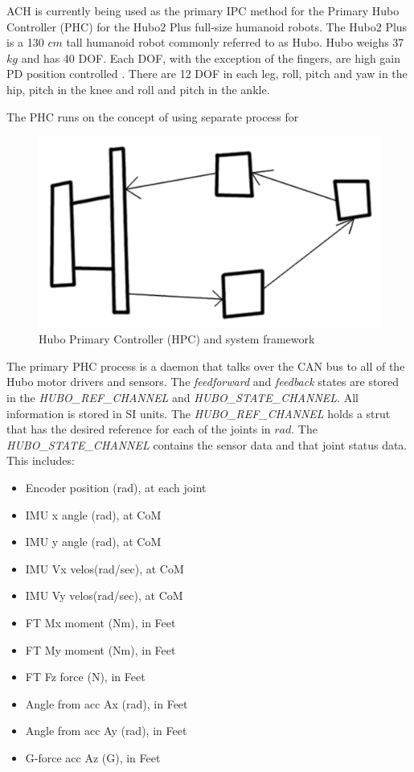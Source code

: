 ACH is currently being used as the primary IPC method for the Primary Hubo Controller (PHC) for the Hubo2 Plus full-size humanoid robots.  
The Hubo2 Plus is a 130 $cm$ tall humanoid robot commonly referred to as Hubo.  
Hubo weighs 37 $kg$ and has 40 DOF.
Each DOF, with the exception of the fingers, are high gain PD position controlled .  
There are 12 DOF in each leg, roll, pitch and yaw in the hip, pitch in the knee and roll and pitch in the ankle.  

The PHC runs on the concept of using separate process for 


\begin{figure}[thpb]
  \centering
\includegraphics[width=1.0\columnwidth]{./pix/tmpGraph.png}
  \caption{Hubo Primary Controller (HPC) and system framework}
  \label{fig:graph}
\end{figure}

The primary PHC process is a daemon that talks over the CAN bus to all of the Hubo motor drivers and sensors.  
The \textit{feedforward} and \textit{feedback} states are stored in the \textit{HUBO\_REF\_CHANNEL} and \textit{HUBO\_STATE\_CHANNEL}.  
All information is stored in SI units.  The \textit{HUBO\_REF\_CHANNEL} holds a strut that has the desired reference for each of the joints in $rad$.  
The \textit{HUBO\_STATE\_CHANNEL} contains the sensor data and that joint status data.  
This includes:

\begin{itemize}
                \item Encoder position (rad), at each joint
                \item IMU x angle (rad), at CoM
                \item IMU y angle (rad), at CoM
                \item IMU Vx velos(rad/sec), at CoM
                \item IMU Vy velos(rad/sec), at CoM
                \item FT Mx moment (Nm), in Feet
                \item FT My moment (Nm), in Feet
                \item FT Fz force (N), in Feet
                \item Angle from acc Ax (rad), in Feet
                \item Angle from acc Ay (rad), in Feet
                \item G-force acc Az (G), in Feet
\end{itemize}

